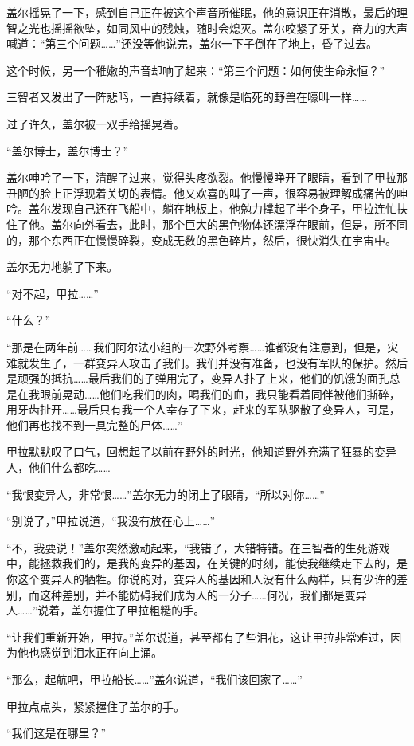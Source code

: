 盖尔摇晃了一下，感到自己正在被这个声音所催眠，他的意识正在消散，最后的理智之光也摇摇欲坠，如同风中的残烛，随时会熄灭。盖尔咬紧了牙关，奋力的大声喊道：“第三个问题……”还没等他说完，盖尔一下子倒在了地上，昏了过去。 

这个时候，另一个稚嫩的声音却响了起来：“第三个问题：如何使生命永恒？” 

三智者又发出了一阵悲鸣，一直持续着，就像是临死的野兽在嚎叫一样…… 

过了许久，盖尔被一双手给摇晃着。 

“盖尔博士，盖尔博士？” 

盖尔呻吟了一下，清醒了过来，觉得头疼欲裂。他慢慢睁开了眼睛，看到了甲拉那丑陋的脸上正浮现着关切的表情。他又欢喜的叫了一声，很容易被理解成痛苦的呻吟。盖尔发现自己还在飞船中，躺在地板上，他勉力撑起了半个身子，甲拉连忙扶住了他。盖尔向外看去，此时，那个巨大的黑色物体还漂浮在眼前，但是，所不同的，那个东西正在慢慢碎裂，变成无数的黑色碎片，然后，很快消失在宇宙中。 

盖尔无力地躺了下来。 

“对不起，甲拉……” 

“什么？” 

“那是在两年前……我们阿尔法小组的一次野外考察……谁都没有注意到，但是，灾难就发生了，一群变异人攻击了我们。我们并没有准备，也没有军队的保护。然后是顽强的抵抗……最后我们的子弹用完了，变异人扑了上来，他们的饥饿的面孔总是在我眼前晃动……他们吃我们的肉，喝我们的血，我只能看着同伴被他们撕碎，用牙齿扯开……最后只有我一个人幸存了下来，赶来的军队驱散了变异人，可是，他们再也找不到一具完整的尸体……” 

甲拉默默叹了口气，回想起了以前在野外的时光，他知道野外充满了狂暴的变异人，他们什么都吃…… 

“我恨变异人，非常恨……”盖尔无力的闭上了眼睛，“所以对你……” 

“别说了，”甲拉说道，“我没有放在心上……” 

“不，我要说！”盖尔突然激动起来，“我错了，大错特错。在三智者的生死游戏中，能拯救我们的，是我的变异的基因，在关键的时刻，能使我继续走下去的，是你这个变异人的牺牲。你说的对，变异人的基因和人没有什么两样，只有少许的差别，而这种差别，并不能防碍我们成为人的一分子……何况，我们都是变异人……”说着，盖尔握住了甲拉粗糙的手。 

“让我们重新开始，甲拉。”盖尔说道，甚至都有了些泪花，这让甲拉非常难过，因为他也感觉到泪水正在向上涌。 

“那么，起航吧，甲拉船长……”盖尔说道，“我们该回家了……” 

甲拉点点头，紧紧握住了盖尔的手。 

“我们这是在哪里？” 

